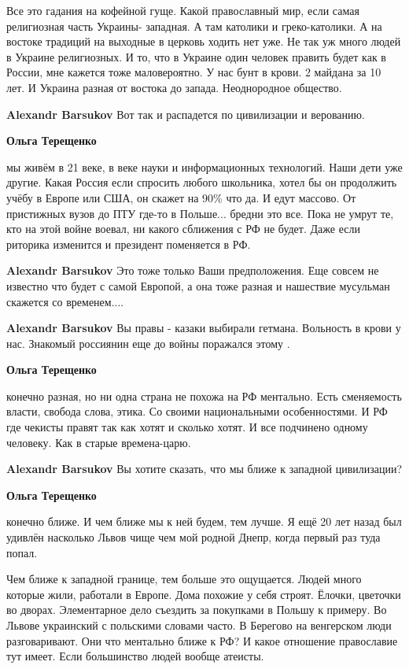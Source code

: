 \begin{itemize}

Все это гадания на кофейной гуще. Какой православный мир, если самая
религиозная часть Украины- западная. А там католики и греко-католики. А на
востоке традиций на выходные в церковь ходить нет уже. Не так уж много людей в
Украине религиозных. И то, что в Украине один человек править будет как в
России, мне кажется тоже маловероятно. У нас бунт в крови. 2 майдана за 10
лет. И Украина разная от востока до запада. Неоднородное общество.

\begin{itemize} %
\textbf{Alexandr Barsukov} Вот так и распадется по цивилизации и верованию.

\textbf{Ольга Терещенко} 

мы живём в 21 веке, в веке науки и информационных технологий. Наши дети уже
другие. Какая Россия если спросить любого школьника, хотел бы он продолжить
учёбу в Европе или США, он скажет на 90\% что да. И едут массово. От пристижных
вузов до ПТУ где-то в Польше... бредни это все. Пока не умрут те, кто на этой
войне воевал, ни какого сближения с РФ не будет. Даже если риторика изменится и
президент поменяется в РФ.

\textbf{Alexandr Barsukov} Это тоже только Ваши предположения.
Еще совсем не известно что будет с самой Европой, а она тоже разная и нашествие мусульман скажется со временем....

\textbf{Alexandr Barsukov} Вы правы - казаки выбирали гетмана. Вольность в крови у нас. Знакомый россиянин еще до войны поражался этому .

\textbf{Ольга Терещенко} 

конечно разная, но ни одна страна не похожа на РФ ментально. Есть сменяемость
власти, свобода слова, этика. Со своими национальными особенностями. И РФ где
чекисты правят так как хотят и сколько хотят. И все подчинено одному человеку.
Как в старые времена-царю.


\textbf{Alexandr Barsukov} Вы хотите сказать, что мы ближе к западной цивилизации?

\textbf{Ольга Терещенко} 

конечно ближе. И чем ближе мы к ней будем, тем лучше. Я ещё 20 лет назад был
удивлён насколько Львов чище чем мой родной Днепр, когда первый раз туда попал.

Чем ближе к западной границе, тем больше это ощущается. Людей много которые
жили, работали в Европе. Дома похожие у себя строят. Ёлочки, цветочки во
дворах. Элементарное дело съездить за покупками в Польшу к примеру. Во Львове
украинский с польскими словами часто. В Берегово на венгерском люди
разговаривают. Они что ментально ближе к РФ? И какое отношение православие тут
имеет. Если большинство людей вообще атеисты.


\end{itemize}
\end{itemize}
